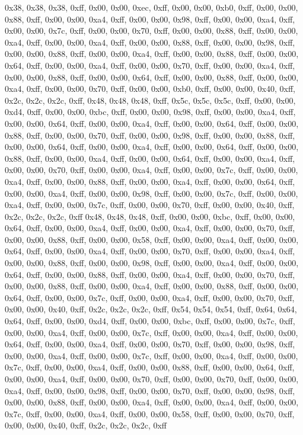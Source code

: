 0x38, 0x38, 0x38, 0xff, 0x00, 0x00, 0xec, 0xff, 0x00, 0x00, 0xb0, 0xff, 0x00, 0x00, 0x88, 0xff, 0x00, 0x00, 0xa4, 0xff, 0x00, 0x00, 0x98, 0xff, 0x00, 0x00, 0xa4, 0xff, 0x00, 0x00, 0x7c, 0xff, 0x00, 0x00, 0x70, 0xff, 0x00, 0x00, 0x88, 0xff, 0x00, 0x00, 0xa4, 0xff, 0x00, 0x00, 0xa4, 0xff, 0x00, 0x00, 0x88, 0xff, 0x00, 0x00, 0x98, 0xff, 0x00, 0x00, 0x88, 0xff, 0x00, 0x00, 0xa4, 0xff, 0x00, 0x00, 0x88, 0xff, 0x00, 0x00, 0x64, 0xff, 0x00, 0x00, 0xa4, 0xff, 0x00, 0x00, 0x70, 0xff, 0x00, 0x00, 0xa4, 0xff, 0x00, 0x00, 0x88, 0xff, 0x00, 0x00, 0x64, 0xff, 0x00, 0x00, 0x88, 0xff, 0x00, 0x00, 0xa4, 0xff, 0x00, 0x00, 0x70, 0xff, 0x00, 0x00, 0xb0, 0xff, 0x00, 0x00, 0x40, 0xff, 0x2c, 0x2c, 0x2c, 0xff, 0x48, 0x48, 0x48, 0xff, 0x5c, 0x5c, 0x5c, 0xff, 0x00, 0x00, 0xd4, 0xff, 0x00, 0x00, 0xbc, 0xff, 0x00, 0x00, 0x98, 0xff, 0x00, 0x00, 0xa4, 0xff, 0x00, 0x00, 0x64, 0xff, 0x00, 0x00, 0xa4, 0xff, 0x00, 0x00, 0x64, 0xff, 0x00, 0x00, 0x88, 0xff, 0x00, 0x00, 0x70, 0xff, 0x00, 0x00, 0x98, 0xff, 0x00, 0x00, 0x88, 0xff, 0x00, 0x00, 0x64, 0xff, 0x00, 0x00, 0xa4, 0xff, 0x00, 0x00, 0x64, 0xff, 0x00, 0x00, 0x88, 0xff, 0x00, 0x00, 0xa4, 0xff, 0x00, 0x00, 0x64, 0xff, 0x00, 0x00, 0xa4, 0xff, 0x00, 0x00, 0x70, 0xff, 0x00, 0x00, 0xa4, 0xff, 0x00, 0x00, 0x7c, 0xff, 0x00, 0x00, 0xa4, 0xff, 0x00, 0x00, 0x88, 0xff, 0x00, 0x00, 0xa4, 0xff, 0x00, 0x00, 0x64, 0xff, 0x00, 0x00, 0xa4, 0xff, 0x00, 0x00, 0x98, 0xff, 0x00, 0x00, 0x7c, 0xff, 0x00, 0x00, 0xa4, 0xff, 0x00, 0x00, 0x7c, 0xff, 0x00, 0x00, 0x70, 0xff, 0x00, 0x00, 0x40, 0xff, 0x2c, 0x2c, 0x2c, 0xff
0x48, 0x48, 0x48, 0xff, 0x00, 0x00, 0xbc, 0xff, 0x00, 0x00, 0x64, 0xff, 0x00, 0x00, 0xa4, 0xff, 0x00, 0x00, 0xa4, 0xff, 0x00, 0x00, 0x70, 0xff, 0x00, 0x00, 0x88, 0xff, 0x00, 0x00, 0x58, 0xff, 0x00, 0x00, 0xa4, 0xff, 0x00, 0x00, 0x64, 0xff, 0x00, 0x00, 0xa4, 0xff, 0x00, 0x00, 0x70, 0xff, 0x00, 0x00, 0xa4, 0xff, 0x00, 0x00, 0x88, 0xff, 0x00, 0x00, 0x98, 0xff, 0x00, 0x00, 0xa4, 0xff, 0x00, 0x00, 0x64, 0xff, 0x00, 0x00, 0x88, 0xff, 0x00, 0x00, 0xa4, 0xff, 0x00, 0x00, 0x70, 0xff, 0x00, 0x00, 0x88, 0xff, 0x00, 0x00, 0xa4, 0xff, 0x00, 0x00, 0x88, 0xff, 0x00, 0x00, 0x64, 0xff, 0x00, 0x00, 0x7c, 0xff, 0x00, 0x00, 0xa4, 0xff, 0x00, 0x00, 0x70, 0xff, 0x00, 0x00, 0x40, 0xff, 0x2c, 0x2c, 0x2c, 0xff, 0x54, 0x54, 0x54, 0xff, 0x64, 0x64, 0x64, 0xff, 0x00, 0x00, 0xd4, 0xff, 0x00, 0x00, 0xbc, 0xff, 0x00, 0x00, 0x7c, 0xff, 0x00, 0x00, 0xa4, 0xff, 0x00, 0x00, 0x7c, 0xff, 0x00, 0x00, 0xa4, 0xff, 0x00, 0x00, 0x64, 0xff, 0x00, 0x00, 0xa4, 0xff, 0x00, 0x00, 0x70, 0xff, 0x00, 0x00, 0x98, 0xff, 0x00, 0x00, 0xa4, 0xff, 0x00, 0x00, 0x7c, 0xff, 0x00, 0x00, 0xa4, 0xff, 0x00, 0x00, 0x7c, 0xff, 0x00, 0x00, 0xa4, 0xff, 0x00, 0x00, 0x88, 0xff, 0x00, 0x00, 0x64, 0xff, 0x00, 0x00, 0xa4, 0xff, 0x00, 0x00, 0x70, 0xff, 0x00, 0x00, 0x70, 0xff, 0x00, 0x00, 0xa4, 0xff, 0x00, 0x00, 0x98, 0xff, 0x00, 0x00, 0x70, 0xff, 0x00, 0x00, 0x98, 0xff, 0x00, 0x00, 0x88, 0xff, 0x00, 0x00, 0xa4, 0xff, 0x00, 0x00, 0xa4, 0xff, 0x00, 0x00, 0x7c, 0xff, 0x00, 0x00, 0xa4, 0xff, 0x00, 0x00, 0x58, 0xff, 0x00, 0x00, 0x70, 0xff, 0x00, 0x00, 0x40, 0xff, 0x2c, 0x2c, 0x2c, 0xff
